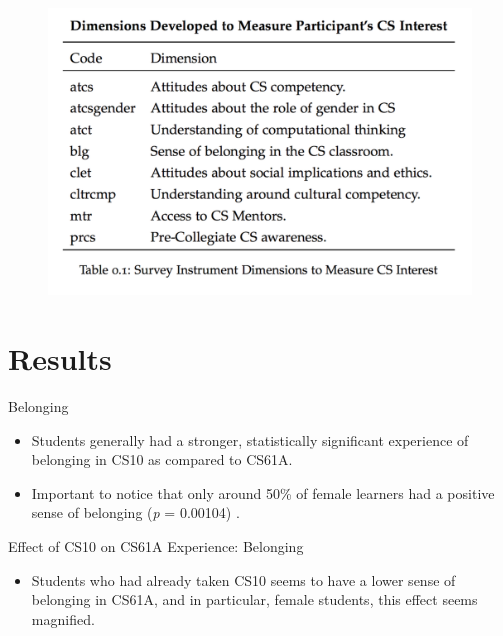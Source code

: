 \documentclass{beamer}                  %
\begin{document}
\begin{frame}{}

  \begin{figure}[!htbp]
      \centering   
      \includegraphics[width=1\textwidth]{CSAttitudes}   
  \end{figure}

\end{frame}

\section{Results}
\begin{frame}{Belonging}
\begin{itemize}
\item Students generally had a stronger, statistically significant experience of belonging in CS10 as compared to CS61A. 
\item Important to notice that only around 50\% of female learners had a positive sense of belonging (\emph{p} = 0.00104) . 
\end{itemize}
\end{frame}

\begin{frame}{Effect of CS10 on CS61A Experience: Belonging}
  \begin{itemize}
  \item Students who had already taken CS10 seems to have a lower sense of belonging in CS61A, and in particular, female students, this effect seems magnified.
  \end{itemize}
\end{frame}
    
\end{document}
